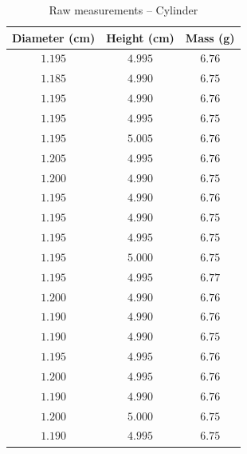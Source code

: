 \begin{table}[htb!]
\centering
\caption{Raw measurements -- Cylinder}
\begin{tabular}{ccc}
\toprule
Diameter (\unit{\cm}) & Height (\unit{\cm}) & Mass (\unit{\g}) \\
\midrule
$1.195$ & $4.995$ & $6.76$ \\
$1.185$ & $4.990$ & $6.75$ \\
$1.195$ & $4.990$ & $6.76$ \\
$1.195$ & $4.995$ & $6.75$ \\
$1.195$ & $5.005$ & $6.76$ \\
$1.205$ & $4.995$ & $6.76$ \\
$1.200$ & $4.990$ & $6.75$ \\
$1.195$ & $4.990$ & $6.76$ \\
$1.195$ & $4.990$ & $6.75$ \\
$1.195$ & $4.995$ & $6.75$ \\
$1.195$ & $5.000$ & $6.75$ \\
$1.195$ & $4.995$ & $6.77$ \\
$1.200$ & $4.990$ & $6.76$ \\
$1.190$ & $4.990$ & $6.76$ \\
$1.190$ & $4.990$ & $6.75$ \\
$1.195$ & $4.995$ & $6.76$ \\
$1.200$ & $4.995$ & $6.76$ \\
$1.190$ & $4.990$ & $6.76$ \\
$1.200$ & $5.000$ & $6.75$ \\
$1.190$ & $4.995$ & $6.75$ \\
\bottomrule
\end{tabular}
\end{table}
